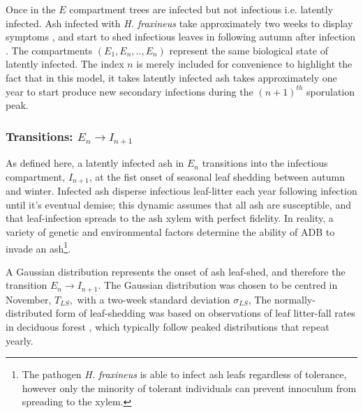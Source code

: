 Once in the $E$ compartment trees are infected but not infectious i.e. latently infected.
Ash infected with \textit{H. fraxineus} take approximately two weeks to display symptoms \cite{https://doi.org/10.1111/ppa.12048, https://doi.org/10.1111/ppa.12844},
and start to shed infectious leaves in following autumn after infection \cite{gross2014h}.
The compartments $(E_1, E_n,..,E_n)$ represent the same biological state of latently infected.
The index $n$ is merely included for convenience to highlight the fact that in this model, it takes latently infected ash takes approximately one year to start produce new secondary infections during the $(n+1)^{th}$ sporulation peak.


\subsubsection{Transitions: $E_n\rightarrow I_{n+1}$}

As defined here, a latently infected ash in $E_n$ transitions into the infectious compartment, $I_{n+1}$, at the fist onset of seasonal leaf shedding between autumn and winter.
Infected ash disperse infectious leaf-litter each year following infection until it's eventual demise;
this dynamic assumes that all ash are susceptible, and that leaf-infection spreads to the ash xylem with perfect fidelity. 
In reality, a variety of genetic and environmental factors determine the ability of ADB to invade an ash\footnote{
The pathogen \textit{H. fraxineus} is able to infect ash leafs regardless of tolerance, however only the minority of tolerant individuals can prevent innoculum from spreading to the xylem.}.

A Gaussian distribution represents the onset of ash leaf-shed, and therefore the transition $E_n\rightarrow I_{n+1}$.
The Gaussian distribution was chosen to be centred in November, $T_{LS},$ with a two-week standard deviation $\sigma_{LS}$,
The normally-distributed form of leaf-shedding was based on observations of leaf litter-fall rates in deciduous forest \cite{zhang2014seasonal, dixon1976analysis}, 
which typically follow peaked distributions that repeat yearly.

